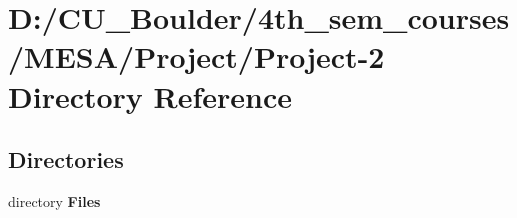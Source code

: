\section{D\+:/\+C\+U\+\_\+\+Boulder/4th\+\_\+sem\+\_\+courses/\+M\+E\+S\+A/\+Project/\+Project-\/2 Directory Reference}
\label{dir_7b5165697b47099fb2e8e21bc55e34a8}
\subsection*{Directories}
\begin{DoxyCompactItemize}
\item 
directory \textbf{ Files}
\end{DoxyCompactItemize}
